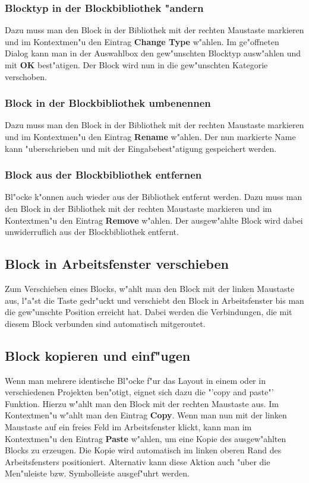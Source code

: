 \documentclass[a4paper,titlepage,12pt,ngerman]{scrbook}
\begin{document}
\subsubsection{Blocktyp in der Blockbibliothek "andern}
Dazu muss man den Block in der Bibliothek mit der rechten Maustaste markieren und im Kontextmen"u den Eintrag {\bf Change Type} w"ahlen. Im ge"offneten Dialog kann man in der Auswahlbox den gew"unschten Blocktyp ausw"ahlen und mit {\bf OK} best"atigen. Der Block wird nun in die gew"unschten Kategorie verschoben.
\subsubsection{Block in der Blockbibliothek umbenennen}
Dazu muss man den Block in der Bibliothek mit der rechten Maustaste markieren und im Kontextmen"u den Eintrag {\bf Rename} w"ahlen. Der nun markierte Name kann "uberschrieben und mit der Eingabebest"atigung gespeichert werden.
\subsubsection{Block aus der Blockbibliothek entfernen}
Bl"ocke k"onnen auch wieder aus der Bibliothek entfernt werden. Dazu muss man den
Block in der Bibliothek mit der rechten Maustaste markieren und im Kontextmen"u den
Eintrag {\bf Remove} w"ahlen. Der ausgew"ahlte Block wird dabei unwiderruflich aus der Blockbibliothek entfernt.

\subsection{Block in Arbeitsfenster verschieben}
Zum Verschieben eines Blocks, w"ahlt man den Block mit der linken Maustaste aus, l"a"st die Taste gedr"uckt und verschiebt den Block in Arbeitsfenster bis man die gew"unschte Position erreicht hat. Dabei werden die Verbindungen, die mit diesem Block verbunden sind automatisch mitgeroutet.


\subsection{Block kopieren und einf"ugen}
Wenn man mehrere identische Bl"ocke f"ur das Layout in einem oder in verschiedenen Projekten ben"otigt, eignet sich dazu die "'copy and paste"' Funktion. Hierzu w"ahlt man den Block mit der rechten Maustaste aus. Im Kontextmen"u w"ahlt man den Eintrag {\bf Copy}. Wenn man nun mit der linken Maustaste auf ein freies Feld im Arbeitsfenster klickt, kann man im Kontextmen"u den Eintrag {\bf Paste} w"ahlen, um eine Kopie des ausgew"ahlten Blocks zu erzeugen.
Die Kopie wird automatisch im linken oberen Rand des Arbeitsfensters positioniert.\newline
Alternativ kann diese Aktion auch "uber die Men"uleiste bzw. Symbolleiste ausgef"uhrt werden.
\end{document}
